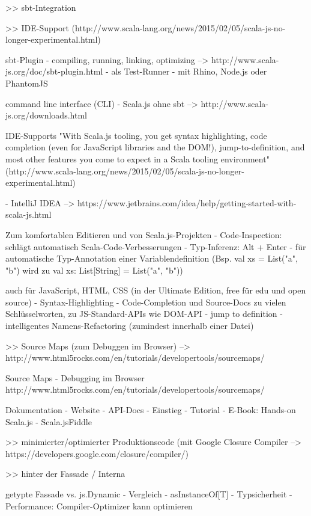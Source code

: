 \documentclass[a4paper, 12pt, listof=totoc, bibliography=totoc]{scrreprt}
\begin{document}
>> sbt-Integration


>> IDE-Support
(http://www.scala-lang.org/news/2015/02/05/scala-js-no-longer-experimental.html)

sbt-Plugin
  - compiling, running, linking, optimizing --> http://www.scala-js.org/doc/sbt-plugin.html
  - als Test-Runner - mit Rhino, Node.js oder PhantomJS

command line interface (CLI)
  - Scala.js ohne sbt  -->  http://www.scala-js.org/downloads.html

IDE-Supports
  "With Scala.js tooling, you get syntax highlighting, code completion (even for JavaScript libraries and the DOM!), jump-to-definition, and most other features you come to expect in a Scala tooling environment" (http://www.scala-lang.org/news/2015/02/05/scala-js-no-longer-experimental.html)

  - IntelliJ IDEA  -->  https://www.jetbrains.com/idea/help/getting-started-with-scala-js.html

    Zum komfortablen Editieren und von Scala.js-Projekten
    - Code-Inspection: schlägt automatisch Scala-Code-Verbesserungen
    - Typ-Inferenz: Alt + Enter - für automatische Typ-Annotation einer Variablendefinition (Bsp. val xs = List("a", "b") wird zu val xs: List[String] = List("a", "b"))

    auch für JavaScript, HTML, CSS (in der Ultimate Edition, free für edu und open source)
      - Syntax-Highlighting
      - Code-Completion und Source-Docs zu vielen Schlüsselworten, zu JS-Standard-APIs wie DOM-API
      - jump to definition
      - intelligentes Namens-Refactoring (zumindest innerhalb einer Datei)


>> Source Maps (zum Debuggen im Browser)  -->  http://www.html5rocks.com/en/tutorials/developertools/sourcemaps/

Source Maps
  - Debugging im Browser
  http://www.html5rocks.com/en/tutorials/developertools/sourcemaps/

Dokumentation
  - Website
  - API-Docs
  - Einstieg
    - Tutorial
    - E-Book: Hands-on Scala.js
    - Scala.jsFiddle


>> minimierter/optimierter Produktionscode (mit Google Closure Compiler  -->  https://developers.google.com/closure/compiler/)








>> hinter der Fassade / Interna

getypte Fassade vs. js.Dynamic
- Vergleich
- asInstanceOf[T]
  - Typsicherheit
  - Performance: Compiler-Optimizer kann optimieren
\end{document}

